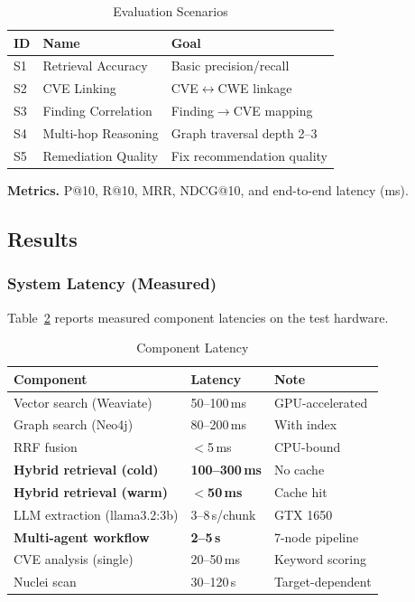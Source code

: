 \documentclass[conference]{IEEEtran}
\begin{document}
\begin{table}[htbp]
  \centering
  \caption{Evaluation Scenarios}
  \label{tab:scenarios}
  \begin{tabular}{llp{3.2cm}}
    \toprule
    \textbf{ID} & \textbf{Name} & \textbf{Goal} \\
    \midrule
    S1 & Retrieval Accuracy   & Basic precision/recall \\
    S2 & CVE Linking          & CVE$\leftrightarrow$CWE linkage \\
    S3 & Finding Correlation  & Finding$\to$CVE mapping \\
    S4 & Multi-hop Reasoning  & Graph traversal depth 2--3 \\
    S5 & Remediation Quality  & Fix recommendation quality \\
    \bottomrule
  \end{tabular}
\end{table}

\textbf{Metrics.}
P@10, R@10, MRR, NDCG@10, and end-to-end latency (ms).

\subsection{Results}

\subsubsection{System Latency (Measured)}

Table~\ref{tab:latency} reports measured component latencies on the test
hardware.

\begin{table}[htbp]
  \centering
  \caption{Component Latency}
  \label{tab:latency}
  \begin{tabular}{lll}
    \toprule
    \textbf{Component} & \textbf{Latency} & \textbf{Note} \\
    \midrule
    Vector search (Weaviate)         & 50--100\,ms  & GPU-accelerated \\
    Graph search (Neo4j)             & 80--200\,ms  & With index \\
    RRF fusion                       & $<$5\,ms     & CPU-bound \\
    \textbf{Hybrid retrieval (cold)} & \textbf{100--300\,ms} & No cache \\
    \textbf{Hybrid retrieval (warm)} & \textbf{$<$50\,ms}    & Cache hit \\
    LLM extraction (llama3.2:3b)     & 3--8\,s/chunk & GTX 1650 \\
    \textbf{Multi-agent workflow}    & \textbf{2--5\,s} & 7-node pipeline \\
    CVE analysis (single)            & 20--50\,ms   & Keyword scoring \\
    Nuclei scan                      & 30--120\,s   & Target-dependent \\
    \bottomrule
  \end{tabular}
\end{table}
\end{document}
